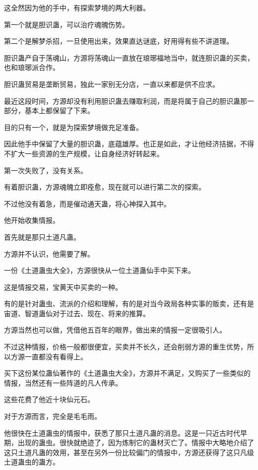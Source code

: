 \begin{this_body}
这全然因为他的手中，有探索梦境的两大利器。

第一个就是胆识蛊，可以治疗魂魄伤势。

第二个是解梦杀招，一旦使用出来，效果直达谜底，好用得有些不讲道理。

胆识蛊产自于荡魂山，方源将荡魂山一直放在琅琊福地当中，就连胆识蛊的买卖，也和琅琊派合作。

胆识蛊贸易是垄断贸易，独此一家别无分店，一直以来都是供不应求。

最近这段时间，方源却没有利用胆识蛊去赚取利润，而是将属于自己的胆识蛊那一部分，基本上都保留了下来。

目的只有一个，就是为探索梦境做充足准备。

因此他手中保留了大量的胆识蛊，底蕴雄厚。也正是如此，才让他经济拮据，不得不扩大一些资源的生产规模，让自身经济好转起来。

第一次失败了，没有关系。

有着胆识蛊，方源魂魄立即痊愈，现在就可以进行第二次的探索。

不过他没有着急，而是催动通天蛊，将心神探入其中。

他开始收集情报。

首先就是那只土道凡蛊。

方源并不认识，他需要了解。

一份《土道蛊虫大全》，方源很快从一位土道蛊仙手中买下来。

这是情报交易，宝黄天中买卖的一种。

有的是针对蛊虫、流派的介绍和理解，有的是对当今政局各种实事的贩卖，还有是宙道、智道蛊仙对于过去、现在、将来的推算。

方源当然也可以做，凭借他五百年的眼界，做出来的情报一定很吸引人。

不过这种情报，价格一般都很便宜，买卖并不长久，还会削弱方源的重生优势，所以方源一直都没有看得上。

买下这份某位蛊仙著作的《土道蛊虫大全》，方源并不满足，又购买了一些类似的情报，当然还有一些阵道的凡人传承。

这些花费了他近十块仙元石。

对于方源而言，完全是毛毛雨。

他很快在土道蛊虫的情报中，获悉了那只土道凡蛊的消息。这是一只近古时代早期，出现的蛊虫。很快就绝迹了，因为炼制它的蛊材灭亡了。情报中大略地介绍了这只土道凡蛊的效用，甚至在另外一份比较偏门的情报中，方源还获得了这只凡级土道蛊虫的蛊方。

\end{this_body}

